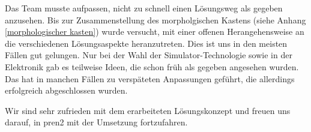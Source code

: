 \documentclass[../main.tex]{subfiles}
\begin{document}
Das Team musste aufpassen, nicht zu schnell einen Lösungsweg als gegeben anzusehen. Bis zur Zusammenstellung des morpholgischen Kastens (siehe Anhang \ref{morphologischer kasten}) wurde versucht, mit einer offenen Herangehensweise an die verschiedenen Lösungsaspekte heranzutreten. Dies ist uns in den meisten Fällen gut gelungen. Nur bei der Wahl der Simulator-Technologie sowie in der Elektronik gab es teilweise Ideen, die schon früh als gegeben angesehen wurden. Das hat in manchen Fällen zu verspäteten Anpassungen geführt, die allerdings erfolgreich abgeschlossen wurden.

Wir sind sehr zufrieden mit dem erarbeiteten Lösungskonzept und freuen uns darauf, in \acrshort{pren2} mit der Umsetzung fortzufahren.
\end{document}
